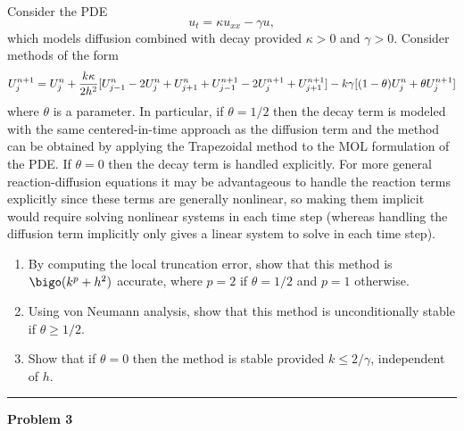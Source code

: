 \documentclass[10pt]{article}
\begin{document}
Consider the PDE
\begin{equation}\label{diffdecay}
u_t = \kappa u_{xx} - \gamma u,
\end{equation}
which models diffusion combined with decay provided $\kappa>0$ and $\gamma>0$.  
Consider methods of the form
\begin{equation}\label{ddtheta}
U_j^{n+1} =U_j^n+{k\kappa\over 2h^2} [U_{j-1}^n-2U_j^n +U_{j+1}^n
+U_{j-1}^{n+1} - 2U_j^{n+1} + U_{j+1}^{n+1}]
- k\gamma[(1-\theta)U_j^n + \theta U_j^{n+1}]
\end{equation}
where $\theta$ is a parameter.  In particular, if $\theta=1/2$ then the
decay term is modeled with the same centered-in-time approach as the
diffusion term and the method can be obtained by applying the Trapezoidal
method to the MOL formulation of the PDE.   If $\theta=0$ then the decay
term is handled explicitly.  For more general reaction-diffusion equations
it may be advantageous to handle the reaction terms explicitly since these
terms are generally nonlinear, so making them implicit would require solving
nonlinear systems in each time step (whereas handling the diffusion term
implicitly only gives a linear system to solve in each time step).

\begin{enumerate}
\item By computing the local truncation error, show that this method is
$\bigo(k^p+h^2)$ accurate, where $p=2$ if $\theta = 1/2$ and $p=1$
otherwise.
\item Using von Neumann analysis, show that this method is unconditionally
stable if $\theta \geq 1/2$.
\item Show that if $\theta = 0$ then the method is stable provided $k\leq
2/\gamma$, independent of $h$.
\end{enumerate} 





\vskip 1cm
\hrule
{\bf Problem 3}  
\end{document}
